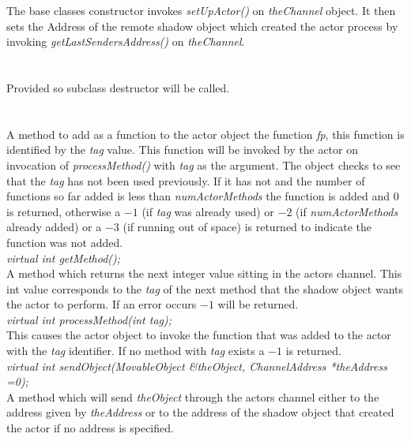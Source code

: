 The base classes constructor invokes {\em setUpActor()} on {\em
theChannel} object. It then sets the Address of the remote shadow
object which created the actor process by invoking {\em
getLastSendersAddress()} on {\em theChannel}. \\


 \\
\\ 
Provided so subclass destructor will be called. \\

  \\
\\
A method to add as a function to the actor object the function {\em
fp}, this function is identified by the {\em tag} value. This
function will be invoked by the actor on invocation of {\em 
processMethod()} with {\em tag} as the argument. The object checks to
see that the {\em tag} has not been used previously. If it has not and
the number of functions so far added is less than {\em numActorMethods}
the function is added and $0$ is returned, otherwise a $-1$ (if {\em
tag} was already used) or $-2$ (if {\em numActorMethods} already
added) or a $-3$ (if running out of space) is returned to indicate the
function was not added. \\  

{\em virtual int  getMethod();} \\
A method which returns the next integer value sitting in the actors
channel. This int value corresponds to the {\em tag} of the next
method that the shadow object wants the actor to perform. If an error
occurs $-1$ will be returned. \\

{\em virtual int  processMethod(int tag);}\\
This causes the actor object to invoke the function that was added to
the actor with the {\em tag} identifier. If no method with {\em tag}
exists a $-1$ is returned. \\


{\em virtual int sendObject(MovableObject \&theObject, ChannelAddress
*theAddress =0);}\\
A method which will send {\em theObject}
through the actors channel either to the address given by {\em
theAddress} or to the address of the shadow object that created the
actor if no address is specified.


